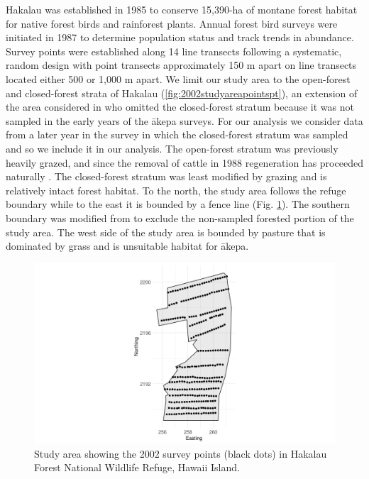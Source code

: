 \documentclass{stylefile16/statsoc}
\newcommand{\akepa}{\textquotesingle\={a}kepa}  %
\newcommand{\hawaii}{Hawai\textquotesingle i}   %
\begin{document}
Hakalau was established in 1985 to conserve 15,390-ha of montane forest habitat for native forest birds and rainforest plants. Annual forest bird surveys were initiated in 1987 to determine population status and track trends in abundance. Survey points were established along 14 line transects following a systematic, random design with point transects approximately 150 m apart on line transects located either 500 or 1,000 m apart. We limit our study area to the open-forest and closed-forest strata of Hakalau (\autoref{fig:2002studyareapointspt}), an extension of the area considered in \cite{camp_population_2010, camp_statespace_2016} who omitted the closed-forest stratum because it was not sampled in the early years of the \akepa{} surveys.  For our analysis we consider data from a later year in the survey in which the closed-forest stratum was sampled and so we include it in our analysis.  The open-forest stratum was previously heavily grazed, and since the removal of cattle in 1988 regeneration has proceeded naturally \citep{maxfield_hakalau_1998}. The closed-forest stratum was least modified by grazing and is relatively intact forest habitat.  To the north, the study area follows the refuge boundary while to the east it is bounded by a fence line (Fig. \ref{fig:2002studyareapointspt}). The southern boundary was modified from \cite{camp_population_2010} to exclude the non-sampled forested portion of the study area. The west side of the study area is bounded by pasture that is dominated by grass and is unsuitable habitat for \akepa.

\begin{figure}
	\centering
	\includegraphics[scale=0.5]{figures/study_area_design.png}
	\caption{Study area showing the 2002 survey points (black dots) in Hakalau Forest National Wildlife Refuge, \hawaii{} Island.}
	\label{fig:2002studyareapointspt}
\end{figure}
\end{document}
